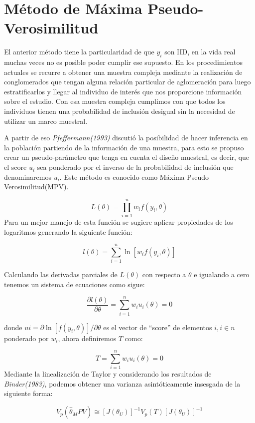 \documentclass[
  12pt,
]{book}
\begin{document}
\hypertarget{muxe9todo-de-muxe1xima-pseudo-verosimilitud}{%
\section{Método de Máxima Pseudo-Verosimilitud}\label{muxe9todo-de-muxe1xima-pseudo-verosimilitud}}

El anterior método tiene la particularidad de que \(y_{i}\) son IID, en la vida real muchas veces no es posible poder cumplir ese supuesto. En los procedimientos actuales se recurre a obtener una muestra compleja mediante la realización de conglomerados que tengan alguna relación particular de aglomeración para luego estratificarlos y llegar al individuo de interés que nos proporcione información sobre el estudio. Con esa muestra compleja cumplimos con que todos los individuos tienen una probabilidad de inclusión desigual sin la necesidad de utilizar un marco muestral.

A partir de eso \emph{Pfeffermann(1993)} discutió la posibilidad de hacer inferencia en la población partiendo de la información de una muestra, para esto se propuso crear un pseudo-parámetro que tenga en cuenta el diseño muestral, es decir, que el score \(u_{i}\) sea ponderado por el inverso de la probabilidad de inclusión que denominaremos \(u_{i}\). Este método es conocido como Máxima Pseudo Verosimilitud(MPV).

\[
L(\theta)=\prod_{i=1}^{n}w_{i}f(y_{i},\theta)
\]
Para un mejor manejo de esta función se sugiere aplicar propiedades de los logaritmos generando la siguiente función:

\[
l(\theta)=\sum_{i=1}^{n}\ln[w_{i}f(y_{i},\theta)]
\]

Calculando las derivadas parciales de \(L(\theta)\) con respecto a \(\theta\) e igualando a cero tenemos un sistema de ecuaciones como sigue:

\[
\dfrac{\partial l(\theta)}{\partial\theta}=\sum_{i=1}^{n}w_{i}u_{i}(\theta)=0
\]

donde \(ui=\partial\ln[f(y_{i},\theta)]/\partial\theta\) es el vector de ``score'' de elementos \(i,i\in n\) ponderado por \(w_{i}\), ahora definiremos \(T\) como:

\[
T=\sum_{i=1}^{n}w_{i}u_{i}(\theta)=0
\]
Mediante la linealización de Taylor y considerando los resultados de \emph{Binder(1983)}, podemos obtener una varianza asintóticamente insesgada de la siguiente forma:

\[
V_{p}(\hat{\theta}_{M}PV)\cong[J(\theta_{U})]^{-1}V_{p}(T)[J(\theta_{U})]^{-1}
\]
\end{document}
